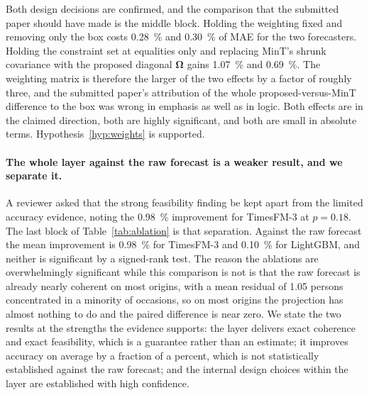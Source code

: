\documentclass[11pt]{article}
\theoremstyle{plain}
\theoremstyle{definition}
\theoremstyle{remark}
\newcommand{\bOm}{\bm{\Omega}}
\newif\ifrevisionmarkup
\newcommand{\new}[1]{\ifrevisionmarkup\textcolor{revision}{#1}\else#1\fi}
\begin{document}
\new{Both design decisions are confirmed, and the comparison that the submitted paper should have made is the middle block. Holding the weighting fixed and removing only the box costs \SI{0.28}{\percent} and \SI{0.30}{\percent} of MAE for the two forecasters. Holding the constraint set at equalities only and replacing MinT's shrunk covariance with the proposed diagonal $\bOm$ gains \SI{1.07}{\percent} and \SI{0.69}{\percent}. The weighting matrix is therefore the larger of the two effects by a factor of roughly three, and the submitted paper's attribution of the whole proposed-versus-MinT difference to the box was wrong in emphasis as well as in logic. Both effects are in the claimed direction, both are highly significant, and both are small in absolute terms. Hypothesis~\ref{hyp:weights} is supported.}

\new{\paragraph{The whole layer against the raw forecast is a weaker result, and we separate it.} A reviewer asked that the strong feasibility finding be kept apart from the limited accuracy evidence, noting the \SI{0.98}{\percent} improvement for TimesFM-3 at $p=\num{0.18}$. The last block of Table~\ref{tab:ablation} is that separation. Against the raw forecast the mean improvement is \SI{0.98}{\percent} for TimesFM-3 and \SI{0.10}{\percent} for LightGBM, and neither is significant by a signed-rank test. The reason the ablations are overwhelmingly significant while this comparison is not is that the raw forecast is already nearly coherent on most origins, with a mean residual of \num{1.05} persons concentrated in a minority of occasions, so on most origins the projection has almost nothing to do and the paired difference is near zero. We state the two results at the strengths the evidence supports: the layer delivers exact coherence and exact feasibility, which is a guarantee rather than an estimate; it improves accuracy on average by a fraction of a percent, which is not statistically established against the raw forecast; and the internal design choices within the layer are established with high confidence.}
\end{document}
